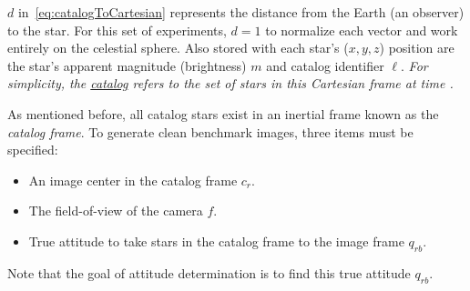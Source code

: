$d$ in~\autoref{eq:catalogToCartesian} represents the distance from the Earth (an observer) to the star.
For this set of experiments, $d = 1$ to normalize each vector and work entirely on the celestial sphere.
Also stored with each star's ($x, y, z$) position are the star's apparent magnitude (brightness) $m$ and catalog
identifier $\ell$.
\textit{For simplicity, the \underline{catalog} refers to the set of stars in this Cartesian frame at time .}

As mentioned before, all catalog stars exist in an inertial frame known as the \textit{catalog frame}.
To generate clean benchmark images, three items must be specified:
\begin{itemize}
    \item An image center in the catalog frame $c_r$.
    \item The field-of-view of the camera $f$.
    \item True attitude to take stars in the catalog frame to the image frame $q_{rb}$.
\end{itemize}

Note that the goal of attitude determination is to find this true attitude $q_{rb}$.

\begin{figure}
\end{figure}


